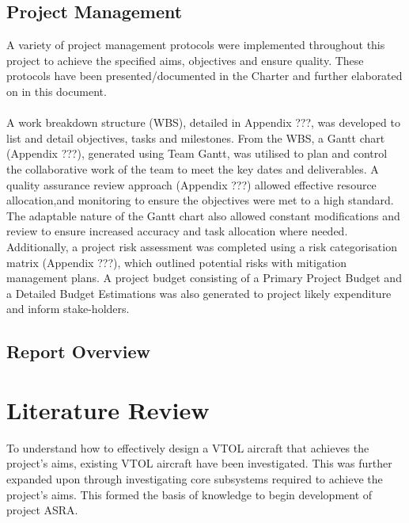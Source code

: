 \subsection{Project Management}
A variety of project management protocols were implemented throughout this project to achieve the specified aims, objectives and ensure quality. These protocols have been presented/documented in the Charter and further elaborated on in this document. \\
\\
A work breakdown structure (WBS), detailed in Appendix ???, was developed to list and detail objectives, tasks and milestones. From the WBS, a Gantt chart (Appendix ???), generated using Team Gantt, was utilised to plan and control the collaborative work of the team to meet the key dates and deliverables. A quality assurance review approach (Appendix ???) allowed effective resource allocation,and monitoring to ensure the objectives were met to a high standard. The adaptable nature of the Gantt chart also allowed constant modifications and review to ensure increased accuracy and task allocation where needed. Additionally, a project risk assessment was completed using a risk categorisation matrix (Appendix ???), which outlined potential risks with mitigation management plans. A project budget consisting of a Primary Project Budget and a Detailed Budget Estimations was also generated to project likely expenditure and inform stake-holders. 

\subsection{Report Overview}

\clearpage

\section{Literature Review}

To understand how to effectively design a VTOL aircraft that achieves the project’s aims, existing VTOL aircraft have been investigated. This was further expanded upon through investigating core subsystems required to achieve the project’s aims. This formed the basis of knowledge to begin development of project ASRA.

